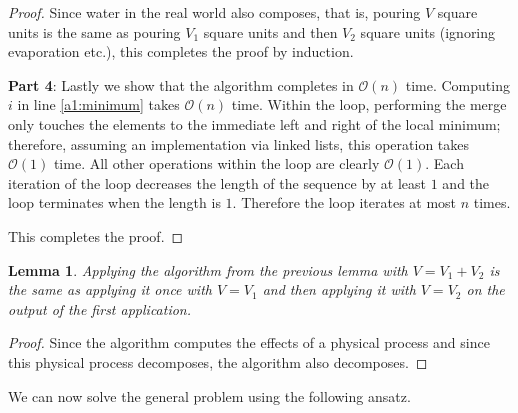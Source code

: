 \documentclass[11pt,a4paper]{article}
\newtheorem{lem}{Lemma}
\newcommand{\bO}{\mathcal{O}}
\begin{document}
\begin{proof}
Since water in the real world also composes, that is, pouring $V$ square units is the same as pouring $V_1$ square units and then $V_2$ square units (ignoring evaporation etc.), this completes the proof by induction.

\textbf{Part 4}: Lastly we show that the algorithm completes in $\bO(n)$ time.
Computing $i$ in line \ref{a1:minimum} takes $\bO(n)$ time.
Within the loop, performing the merge only touches the elements to the immediate left and right of the local minimum; therefore, assuming an implementation via linked lists, this operation takes $\bO(1)$ time.
All other operations within the loop are clearly $\bO(1)$.
Each iteration of the loop decreases the length of the sequence by at least $1$ and the loop terminates when the length is $1$.
Therefore the loop iterates at most $n$ times.

This completes the proof.
\end{proof}

\begin{lem}
  \label{compose}
  Applying the algorithm from the previous lemma with $V = V_1 + V_2$ is the same as applying
  it once with $V = V_1$ and then applying it with $V = V_2$ on the output of the first application.
\end{lem}

\begin{proof}
  Since the algorithm computes the effects of a physical process and since this physical process decomposes, the algorithm also decomposes.
\end{proof}

We can now solve the general problem using the following ansatz.
\end{document}
